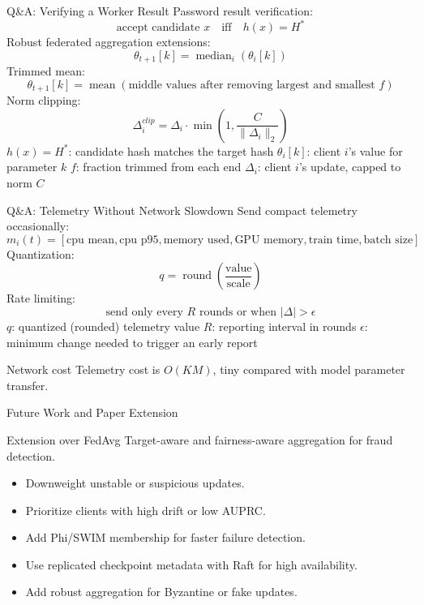 \documentclass[aspectratio=169,10pt]{beamer}
\begin{document}
\begin{frame}{Q\&A: Verifying a Worker Result}
  Password result verification:
  \[
    \text{accept candidate } x
    \quad \text{iff} \quad
    h(x)=H^*
  \]
  Robust federated aggregation extensions:
  \[
    \theta_{t+1}[k] = \operatorname{median}_i(\theta_i[k])
  \]
  Trimmed mean:
  \[
    \theta_{t+1}[k]
    =
    \operatorname{mean}(\text{middle values after removing largest and smallest } f)
  \]
  Norm clipping:
  \[
    \Delta_i^{clip}
    =
    \Delta_i \cdot \min\left(1,\frac{C}{\|\Delta_i\|_2}\right)
  \]
  \footnotesize \(h(x){=}H^*\): candidate hash matches the target hash \quad \(\theta_i[k]\): client \(i\)'s value for parameter \(k\) \quad \(f\): fraction trimmed from each end \quad \(\Delta_i\): client \(i\)'s update, capped to norm \(C\)
\end{frame}

\begin{frame}{Q\&A: Telemetry Without Network Slowdown}
  Send compact telemetry occasionally:
  \[
    m_i(t)=
    [
      \text{cpu mean},
      \text{cpu p95},
      \text{memory used},
      \text{GPU memory},
      \text{train time},
      \text{batch size}
    ]
  \]
  Quantization:
  \[
    q = \operatorname{round}\left(\frac{\text{value}}{\text{scale}}\right)
  \]
  Rate limiting:
  \[
    \text{send only every } R \text{ rounds or when } |\Delta|>\epsilon
  \]
  \footnotesize \(q\): quantized (rounded) telemetry value \quad \(R\): reporting interval in rounds \quad \(\epsilon\): minimum change needed to trigger an early report
  \normalsize
  \begin{block}{Network cost}
    Telemetry cost is \(O(KM)\), tiny compared with model parameter transfer.
  \end{block}
\end{frame}

\begin{frame}{Future Work and Paper Extension}
  \begin{block}{Extension over FedAvg}
    Target-aware and fairness-aware aggregation for fraud detection.
  \end{block}
  \begin{itemize}
    \item Downweight unstable or suspicious updates.
    \item Prioritize clients with high drift or low AUPRC.
    \item Add Phi/SWIM membership for faster failure detection.
    \item Use replicated checkpoint metadata with Raft for high availability.
    \item Add robust aggregation for Byzantine or fake updates.
  \end{itemize}
\end{frame}
\end{document}
